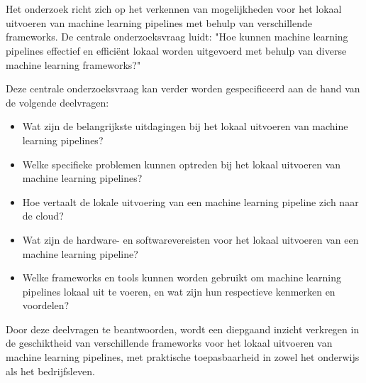 
\section{}%
\label{sec:onderzoeksvraag}

Het onderzoek richt zich op het verkennen van mogelijkheden voor het lokaal uitvoeren van machine learning pipelines met behulp van verschillende frameworks. De centrale onderzoeksvraag luidt: "Hoe kunnen machine learning pipelines effectief en efficiënt lokaal worden uitgevoerd met behulp van diverse machine learning frameworks?"

Deze centrale onderzoeksvraag kan verder worden gespecificeerd aan de hand van de volgende deelvragen:
\begin{itemize}
  \item Wat zijn de belangrijkste uitdagingen bij het lokaal uitvoeren van machine learning pipelines?
  \item Welke specifieke problemen kunnen optreden bij het lokaal uitvoeren van machine learning pipelines?
  \item Hoe vertaalt de lokale uitvoering van een machine learning pipeline zich naar de cloud?
  \item Wat zijn de hardware- en softwarevereisten voor het lokaal uitvoeren van een machine learning pipeline?
  \item Welke frameworks en tools kunnen worden gebruikt om machine learning pipelines lokaal uit te voeren, en wat zijn hun respectieve kenmerken en voordelen?
\end{itemize}

Door deze deelvragen te beantwoorden, wordt een diepgaand inzicht verkregen in de geschiktheid van verschillende frameworks voor het lokaal uitvoeren van machine learning pipelines, met praktische toepasbaarheid in zowel het onderwijs als het bedrijfsleven.

\section{}%
\label{sec:onderzoeksdoelstelling}

